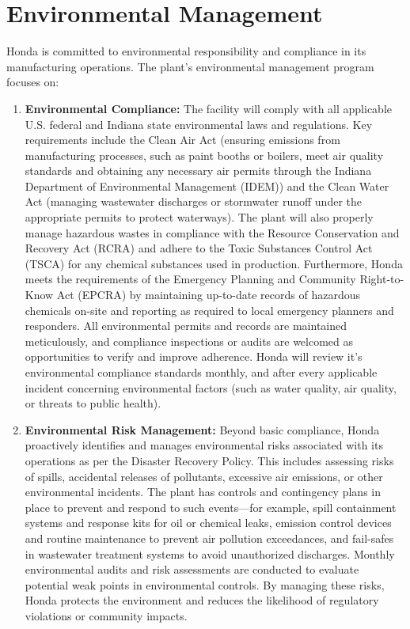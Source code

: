 \section{Environmental Management}
Honda is committed to environmental responsibility and compliance in its manufacturing operations. The plant’s environmental management program focuses on:
\begin{enumerate}
    \item \textbf{Environmental Compliance:} The facility will comply with all applicable U.S. federal and Indiana state environmental laws and regulations. Key requirements include the Clean Air Act (ensuring emissions from manufacturing processes, such as paint booths or boilers, meet air quality standards and obtaining any necessary air permits through the Indiana Department of Environmental Management (IDEM)) and the Clean Water Act (managing wastewater discharges or stormwater runoff under the appropriate permits to protect waterways). The plant will also properly manage hazardous wastes in compliance with the Resource Conservation and Recovery Act (RCRA) and adhere to the Toxic Substances Control Act (TSCA) for any chemical substances used in production. Furthermore, Honda meets the requirements of the Emergency Planning and Community Right-to-Know Act (EPCRA) by maintaining up-to-date records of hazardous chemicals on-site and reporting as required to local emergency planners and responders. All environmental permits and records are maintained meticulously, and compliance inspections or audits are welcomed as opportunities to verify and improve adherence. Honda will review it's environmental compliance standards monthly, and after every applicable incident concerning environmental factors (such as water quality, air quality, or threats to public health).
    \item \textbf{Environmental Risk Management:} Beyond basic compliance, Honda proactively identifies and manages environmental risks associated with its operations as per the Disaster Recovery Policy. This includes assessing risks of spills, accidental releases of pollutants, excessive air emissions, or other environmental incidents. The plant has controls and contingency plans in place to prevent and respond to such events—for example, spill containment systems and response kits for oil or chemical leaks, emission control devices and routine maintenance to prevent air pollution exceedances, and fail-safes in wastewater treatment systems to avoid unauthorized discharges. Monthly environmental audits and risk assessments are conducted to evaluate potential weak points in environmental controls. By managing these risks, Honda protects the environment and reduces the likelihood of regulatory violations or community impacts.

\end{enumerate}
